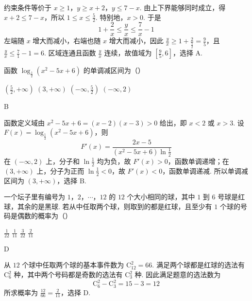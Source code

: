 \begin{solution}
约束条件等价于
\(x\geqslant1\)，\(y\geqslant x+2\)，\(y\leqslant7-x\). 由上下界能够同时成立，得
\(x+2\leqslant7-x\)，所以 \(1\leqslant x\leqslant\frac{5}{2}\). 特别地，\(x>0\). 于是
\[
1+\frac{2}{x}\leqslant\frac{y}{x}\leqslant\frac{7}{x}-1
\]
左端随 \(x\) 增大而减小，右端也随 \(x\) 增大而减小，因此
\(\frac{y}{x}\geqslant1+\frac{2}{\frac{5}{2}}=\frac{9}{5}\)，且 \(\frac{y}{x}\leqslant\frac{7}{1}-1=6\).
区域连通且函数 \(\frac{y}{x}\) 连续，故值域为 \(\left[\frac{9}{5},6\right]\)，选择 A.
\end{solution}

\begin{problem}
函数 \(\log_{\frac{1}{2}}(x^2-5x+6)\) 的单调减区间为（\quad）

\choices
    {\(\left(\frac{5}{2},+\infty\right)\)}
    {\((3,+\infty)\)}
    {\(\left(-\infty,\frac{5}{2}\right)\)}
    {\((-\infty,2)\)}
\end{problem}

\begin{answer}
B
\end{answer}

\begin{solution}
函数定义域由 \(x^2-5x+6=(x-2)(x-3)>0\) 给出，即 \(x<2\) 或 \(x>3\). 设 \(F(x)=\log_{\frac{1}{2}}(x^2-5x+6)\)，则
\[
F'(x)=\frac{2x-5}{(x^2-5x+6)\ln\frac{1}{2}}
\]
在 \((-\infty,2)\) 上，分子和 \(\ln\frac{1}{2}\) 均为负，故 \(F'(x)>0\)，函数单调递增；在 \((3,+\infty)\) 上，分子为正而 \(\ln\frac{1}{2}<0\)，故 \(F'(x)<0\)，函数单调递减. 所以单调减区间为 \((3,+\infty)\)，选择 B.
\end{solution}

\begin{problem}
一个坛子里有编号为 \(1\)，\(2\)，\(\cdots\)，\(12\) 的 \(12\) 个大小相同的球，其中 \(1\) 到 \(6\) 号球是红球，其余的是黑球. 若从中任取两个球，则取到的都是红球，且至少有 \(1\) 个球的号码是偶数的概率为（\quad）

\choices
    {\(\frac{1}{22}\)}
    {\(\frac{1}{11}\)}
    {\(\frac{3}{22}\)}
    {\(\frac{2}{11}\)}
\end{problem}

\begin{answer}
D
\end{answer}

\begin{solution}
从 \(12\) 个球中任取两个球的基本事件数为 \(\mathrm C_{12}^{2}=66\). 满足两个球都是红球的选法有 \(\mathrm C_6^2\) 种，其中两个号码都是奇数的选法有 \(\mathrm C_3^2\) 种. 因此满足题意的选法数为
\[
\mathrm C_6^2-\mathrm C_3^2=15-3=12
\]
所求概率为 \(\frac{12}{66}=\frac{2}{11}\)，选择 D.
\end{solution}

